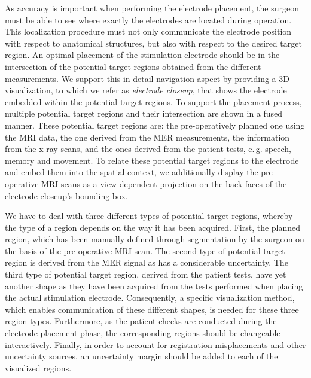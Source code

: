 \documentclass{vgtc}                          %
\begin{document}
As accuracy is important when performing the electrode placement, the surgeon must be able to see where exactly the electrodes are located during operation. This localization procedure must not only communicate the electrode position with respect to anatomical structures, but also with respect to the desired target region. An optimal placement of the stimulation electrode should be in the intersection of the potential target regions obtained from the different measurements. We support this in-detail navigation aspect by providing a 3D visualization, to which we refer as \emph{electrode closeup}, that shows the electrode embedded within the potential target regions. To support the placement process, multiple potential target regions and their intersection are shown in a fused manner. These potential target regions are: the pre-operatively planned one using the MRI data, the one derived from the MER measurements, the information from the x-ray scans, and the ones derived from the patient tests, e.\,g. speech, memory and movement. To relate these potential target regions to the electrode and embed them into the spatial context, we additionally display the pre-operative MRI scans as a view-dependent projection on the back faces of the electrode closeup's bounding box. %

We have to deal with three different types of potential target regions, whereby the type of a region depends on the way it has been acquired. First, the planned region, which has been manually defined through segmentation by the surgeon on the basis of the pre-operative MRI scan. The second type of potential target region is derived from the MER signal as has a considerable uncertainty. The third type of potential target region, derived from the patient tests, have yet another shape as they have been acquired from the tests performed when placing the actual stimulation electrode. Consequently, a specific visualization method, which enables communication of these different shapes, is needed for these three region types. Furthermore, as the patient checks are conducted during the electrode placement phase, the corresponding regions should be changeable interactively. Finally, in order to account for registration misplacements and other uncertainty sources, an uncertainty margin should be added to each of the visualized regions.
\end{document}
